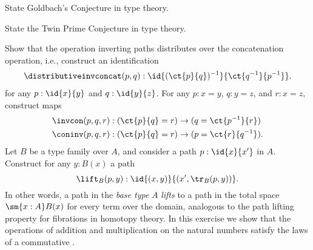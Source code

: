\begin{exercises}
\exercise
  \begin{subexenum}
  \item State Goldbach's Conjecture in type theory.
  \item State the Twin Prime Conjecture in type theory.
  \end{subexenum}
\exercise \label{ex:inv_assoc}Show that the operation inverting paths distributes over the concatenation operation, i.e., construct an identification
  \begin{align*}
    \distributiveinvconcat(p,q):\id{(\ct{p}{q})^{-1}}{\ct{q^{-1}}{p^{-1}}}.
  \end{align*}
  for any $p:\id{x}{y}$ and $q:\id{y}{z}$.
\exercise \label{ex:inv_con}For any $p:x=y$, $q:y=z$, and $r:x=z$, construct maps
  \begin{align*}
    \invcon(p,q,r) & : (\ct{p}{q}=r)\to (q=\ct{p^{-1}}{r}) \\
    \coninv(p,q,r) & : (\ct{p}{q}=r)\to (p=\ct{r}{q^{-1}}).
  \end{align*}
\exercise Let $B$ be a type family over $A$, and consider a path $p:\id{x}{x'}$ in $A$. Construct for any $y:B(x)$ a path
  \begin{equation*}
    \lift_B(p,y) : \id{(x,y)}{(x',\tr_B(p,y))}.
  \end{equation*}
  In other words, a path in the \emph{base type} $A$ \emph{lifts} to a path in the total space $\sm{x:A}B(x)$ for every term over the domain, analogous to the path lifting property for fibrations in homotopy theory.
\exercise \label{ex:semi-ring-laws-N}In this exercise we show that the operations of addition and multiplication on the natural numbers satisfy the laws of a commutative .%

\end{exercises}
